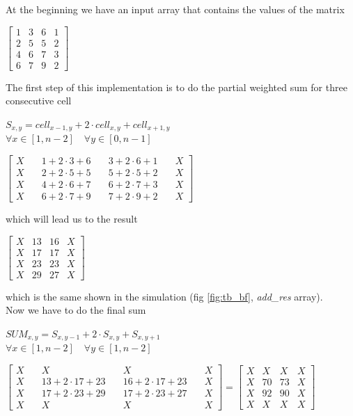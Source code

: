      At the beginning we have an input array that contains the values of the matrix   \begin{center}
     	$ \begin{bmatrix}
     	1 & 3 & 6 & 1\\
	     	2 & 5 & 5 & 2   	\\
	     	4&6 & 7 & 3\\
	     	6&7 & 9 & 2
	     	\end{bmatrix}$
	     	     \end{center}
	  The first step of this implementation is to do the partial weighted sum for three consecutive cell
	  \begin{center}
	  	$ S_{x,y}=cell_{x-1,y}+2\cdot cell_{x,y}+cell_{x+1,y}$\\
	  	$  \forall x\in [1,n-2] \quad\forall y\in[0,n-1]$
	  \end{center}
	   \begin{center}
	   	$ \begin{bmatrix}
	   	X\quad & 1+2\cdot3+6 \quad& 3+2\cdot6+1\quad & X\\
	   	X\quad & 2+2\cdot5+5 \quad& 5+2\cdot5+2\quad & X   	\\
	   	X\quad&4+2\cdot6+7 \quad& 6+2\cdot7+3\quad & X\\
	   	X\quad&6+2\cdot7+9 \quad& 7+2\cdot9+2\quad & X
	   	\end{bmatrix}$
	   \end{center}
	   which will lead us to the result
	   \begin{center}
	   	$ \begin{bmatrix}
	   		X & 13 & 16 & X\\
	   		X & 17 & 17 & X   	\\
	   		X&23 & 23 & X\\
	   		X&29 & 27 & X
	   	\end{bmatrix} $
	   \end{center}
	   which is the same shown in the simulation (fig \ref{fig:tb_bf}, \textit{add\_res} array).\\
	    Now we have to do the final sum
	   \begin{center}
	   	$ SUM_{x,y}=S_{x,y-1}+2\cdot S_{x,y}+S_{x,y+1}$\\
	   		$  \forall x\in [1,n-2] \quad\forall y\in [1,n-2] $
	   \end{center}
	   \bigskip
	  \begin{center}
	  	$ \begin{bmatrix}
	  	X & X & X & X\\
	  	X \quad& 13+2\cdot17+23\quad & 16+2\cdot17+23 \quad& X   	\\
	  	X\quad&17+2\cdot23+29 \quad& 17+2\cdot23+27 \quad& X\\
	  	X&X & X & X
	  	\end{bmatrix} = \begin{bmatrix}
	  	X & X & X & X\\
	  	X & 70 & 73 & X   	\\
	  	X&92 & 90 & X\\
	  	X&X & X & X
	  	\end{bmatrix}$
	  \end{center}
